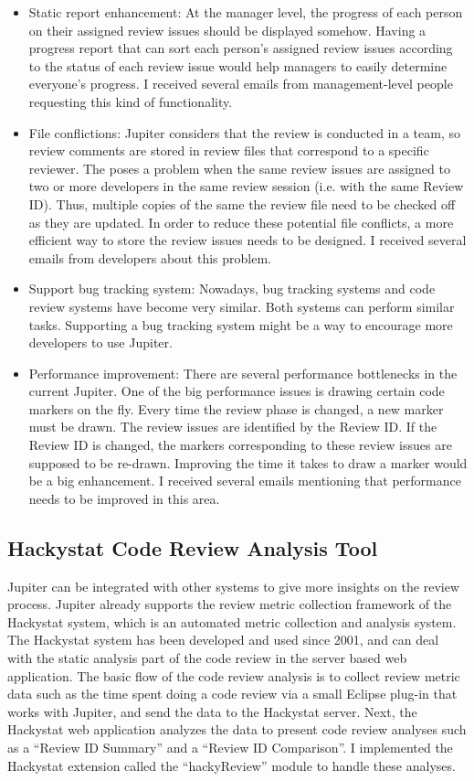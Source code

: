\begin{itemize}
	\item Static report enhancement: At the manager level, the progress of each person on their assigned review issues should be displayed somehow. Having a progress report that can sort each person's assigned review issues according to the status of each review issue would help managers to easily determine everyone's progress. I received several emails from management-level people requesting this kind of functionality.
	\item File conflictions: Jupiter considers that the review is conducted in a team, so review comments are stored in review files that correspond to a specific reviewer. The poses a problem when the same review issues are assigned to two or more developers in the same review session (i.e. with the same Review ID). Thus, multiple copies of the same the review file need to be checked off as they are updated. In order to reduce these potential file conflicts, a more efficient way to store the review issues needs to be designed. I received several emails from developers about this problem.
	\item Support bug tracking system: Nowadays, bug tracking systems and code review systems have become very similar. Both systems can perform similar tasks. Supporting a bug tracking system might be a way to encourage more developers to use Jupiter.
	\item Performance improvement: There are several performance bottlenecks in the current Jupiter. One of the big performance issues is drawing certain code markers on the fly. Every time the review phase is changed, a new marker must be drawn. The review issues are identified by the Review ID. If the Review ID is changed, the markers corresponding to these review issues are supposed to be re-drawn. Improving the time it takes to draw a marker would be a big enhancement. I received several emails mentioning that performance needs to be improved in this area.
\end{itemize}

\subsection{Hackystat Code Review Analysis Tool}
\label{subsec:hackystat-code-review-analysis-tool}

Jupiter can be integrated with other systems to give more insights on the review process. Jupiter already supports the review metric collection framework of the Hackystat system, which is an automated metric collection and analysis system. The Hackystat system has been developed and used since 2001, and can deal with the static analysis part of the code review in the server based web application. The basic flow of the code review analysis is to collect review metric data such as the time spent doing a code review via a small Eclipse plug-in that works with Jupiter, and send the data to the Hackystat server. Next, the Hackystat web application analyzes the data to present code review analyses such as a ``Review ID Summary'' and a ``Review ID Comparison''. I implemented the Hackystat extension called the ``hackyReview'' module to handle these analyses.

